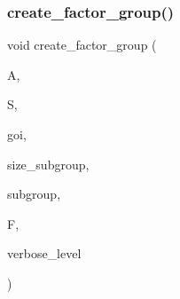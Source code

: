 \subsubsection{\texorpdfstring{create\+\_\+factor\+\_\+group()}{create\_factor\_group()}}
{\footnotesize\ttfamily void create\+\_\+factor\+\_\+group (\begin{DoxyParamCaption}\item[{\mbox{\hyperlink{classaction}{action}} $\ast$}]{A,  }\item[{\mbox{\hyperlink{classsims}{sims}} $\ast$}]{S,  }\item[{\mbox{\hyperlink{galois_8h_a09fddde158a3a20bd2dcadb609de11dc}{I\+NT}}}]{goi,  }\item[{\mbox{\hyperlink{galois_8h_a09fddde158a3a20bd2dcadb609de11dc}{I\+NT}}}]{size\+\_\+subgroup,  }\item[{\mbox{\hyperlink{galois_8h_a09fddde158a3a20bd2dcadb609de11dc}{I\+NT}} $\ast$}]{subgroup,  }\item[{\mbox{\hyperlink{structfactor__group}{factor\+\_\+group}} $\ast$}]{F,  }\item[{\mbox{\hyperlink{galois_8h_a09fddde158a3a20bd2dcadb609de11dc}{I\+NT}}}]{verbose\+\_\+level }\end{DoxyParamCaption})}

